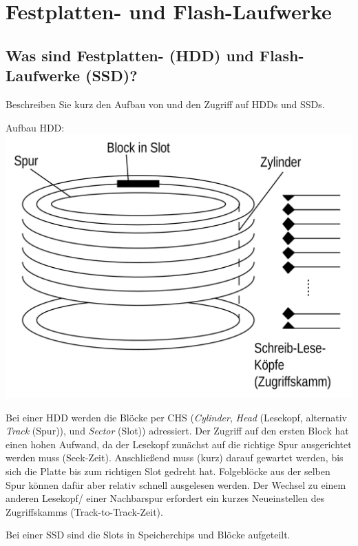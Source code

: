 \section{Festplatten- und Flash-Laufwerke}

\subsection{Was sind Festplatten- (HDD) und Flash-Laufwerke (SSD)?}
Beschreiben Sie kurz den Aufbau von und den Zugriff auf HDDs und SSDs.

\begin{solution}
	\begin{minipage}{0.5\linewidth}
		Aufbau HDD:\\
		\includegraphics[width=\linewidth]{Pictures/hdd}
	\end{minipage}
	\begin{minipage}{0.49\linewidth}
		Bei einer HDD werden die Blöcke per CHS (\textit{Cylinder}, \textit{Head} (Lesekopf, alternativ \textit{Track} (Spur)), und \textit{Sector} (Slot)) adressiert.
		Der Zugriff auf den ersten Block hat einen hohen Aufwand, da der Lesekopf zunächst auf die richtige Spur ausgerichtet werden muss (Seek-Zeit).
		Anschließend muss (kurz) darauf gewartet werden, bis sich die Platte bis zum richtigen Slot gedreht hat.
		Folgeblöcke aus der selben Spur können dafür aber relativ schnell ausgelesen werden.
		Der Wechsel zu einem anderen Lesekopf/ einer Nachbarspur erfordert ein kurzes Neueinstellen des Zugriffskamms (Track-to-Track-Zeit).
	\end{minipage}
	Bei einer SSD sind die Slots in Speicherchips und Blöcke aufgeteilt.

\end{solution}
